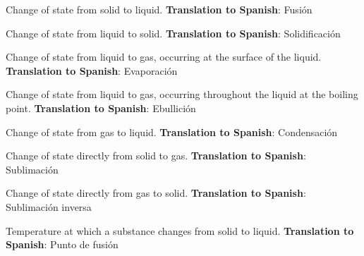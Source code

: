 \begin{vocabulary}[Melting]
    Change of state from solid to liquid. \newline
    \textbf{Translation to Spanish}: Fusión
\end{vocabulary}

\begin{vocabulary}[Freezing]
    Change of state from liquid to solid. \newline
    \textbf{Translation to Spanish}: Solidificación
\end{vocabulary}

\begin{vocabulary}[Evaporation]
    Change of state from liquid to gas, occurring at the surface of the liquid. \newline
    \textbf{Translation to Spanish}: Evaporación
\end{vocabulary}

\begin{vocabulary}[Boiling]
    Change of state from liquid to gas, occurring throughout the liquid at the boiling point. \newline
    \textbf{Translation to Spanish}: Ebullición
\end{vocabulary}

\begin{vocabulary}[Condensation]
    Change of state from gas to liquid. \newline
    \textbf{Translation to Spanish}: Condensación
\end{vocabulary}

\begin{vocabulary}[Sublimation]
    Change of state directly from solid to gas. \newline
    \textbf{Translation to Spanish}: Sublimación
\end{vocabulary}

\begin{vocabulary}[Desublimation]
    Change of state directly from gas to solid. \newline
    \textbf{Translation to Spanish}: Sublimación inversa
\end{vocabulary}

\begin{vocabulary}
    Temperature at which a substance changes from solid to liquid. \newline
    \textbf{Translation to Spanish}: Punto de fusión
\end{vocabulary}

